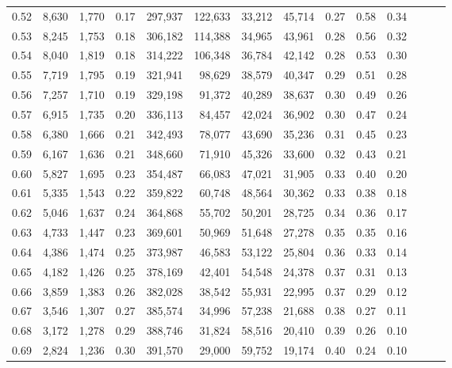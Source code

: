 \begin{tabular}{rrrrrrrrrrrrrr}
0.52 &   8,630 &  1,770 &  0.17 &  297,937 &  122,633 &  33,212 &  45,714 &  0.27 &  0.58 &      0.34 \\
0.53 &   8,245 &  1,753 &  0.18 &  306,182 &  114,388 &  34,965 &  43,961 &  0.28 &  0.56 &      0.32 \\
0.54 &   8,040 &  1,819 &  0.18 &  314,222 &  106,348 &  36,784 &  42,142 &  0.28 &  0.53 &      0.30 \\
0.55 &   7,719 &  1,795 &  0.19 &  321,941 &   98,629 &  38,579 &  40,347 &  0.29 &  0.51 &      0.28 \\
0.56 &   7,257 &  1,710 &  0.19 &  329,198 &   91,372 &  40,289 &  38,637 &  0.30 &  0.49 &      0.26 \\
0.57 &   6,915 &  1,735 &  0.20 &  336,113 &   84,457 &  42,024 &  36,902 &  0.30 &  0.47 &      0.24 \\
0.58 &   6,380 &  1,666 &  0.21 &  342,493 &   78,077 &  43,690 &  35,236 &  0.31 &  0.45 &      0.23 \\
0.59 &   6,167 &  1,636 &  0.21 &  348,660 &   71,910 &  45,326 &  33,600 &  0.32 &  0.43 &      0.21 \\
0.60 &   5,827 &  1,695 &  0.23 &  354,487 &   66,083 &  47,021 &  31,905 &  0.33 &  0.40 &      0.20 \\
0.61 &   5,335 &  1,543 &  0.22 &  359,822 &   60,748 &  48,564 &  30,362 &  0.33 &  0.38 &      0.18 \\
0.62 &   5,046 &  1,637 &  0.24 &  364,868 &   55,702 &  50,201 &  28,725 &  0.34 &  0.36 &      0.17 \\
0.63 &   4,733 &  1,447 &  0.23 &  369,601 &   50,969 &  51,648 &  27,278 &  0.35 &  0.35 &      0.16 \\
0.64 &   4,386 &  1,474 &  0.25 &  373,987 &   46,583 &  53,122 &  25,804 &  0.36 &  0.33 &      0.14 \\
0.65 &   4,182 &  1,426 &  0.25 &  378,169 &   42,401 &  54,548 &  24,378 &  0.37 &  0.31 &      0.13 \\
0.66 &   3,859 &  1,383 &  0.26 &  382,028 &   38,542 &  55,931 &  22,995 &  0.37 &  0.29 &      0.12 \\
0.67 &   3,546 &  1,307 &  0.27 &  385,574 &   34,996 &  57,238 &  21,688 &  0.38 &  0.27 &      0.11 \\
0.68 &   3,172 &  1,278 &  0.29 &  388,746 &   31,824 &  58,516 &  20,410 &  0.39 &  0.26 &      0.10 \\
0.69 &   2,824 &  1,236 &  0.30 &  391,570 &   29,000 &  59,752 &  19,174 &  0.40 &  0.24 &      0.10 \\

\end{tabular}
